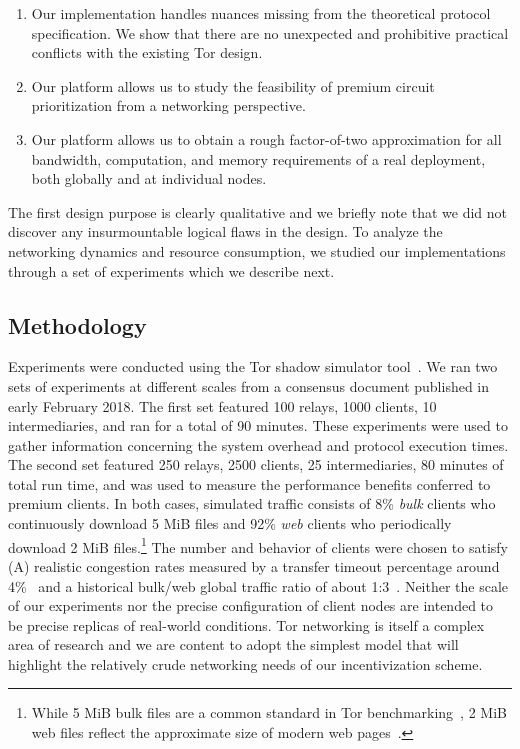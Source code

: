\begin{enumerate}
\item Our implementation handles nuances missing from the theoretical protocol specification. We show that there are no unexpected and prohibitive practical conflicts with the existing Tor design.
\item Our platform allows us to study the feasibility of premium circuit prioritization from a networking perspective.
\item Our platform allows us to obtain a rough factor-of-two approximation for all bandwidth, computation, and memory requirements of a real deployment, both globally and at individual nodes.
\end{enumerate}

The first design purpose is clearly qualitative and we briefly note that we did not discover any insurmountable logical flaws in the design.
To analyze the networking dynamics and resource consumption, we studied our implementations through a set of experiments which we describe next.

\subsection{Methodology}
\label{subsec:methodology}

Experiments were conducted using the Tor shadow simulator tool~\cite{jansen2011shadow, tracey2018high}.
We ran two sets of experiments at different scales from a consensus document published in early February 2018.
The first set featured 100 relays, 1000 clients, 10 intermediaries, and ran for a total of 90 minutes.
These experiments were used to gather information concerning the system overhead and protocol execution times.
The second set featured 250 relays, 2500 clients, 25 intermediaries, 80 minutes of total run time, and was used to measure the performance benefits conferred to premium clients.
In both cases, simulated traffic consists of 8\% \emph{bulk} clients who continuously download 5 MiB files and 92\% \emph{web} clients who periodically download 2 MiB files.\footnote{While 5 MiB bulk files are a common standard in Tor benchmarking~\cite{portal2018tormetrics}, 2 MiB web files reflect the approximate size of modern web pages~\cite{team2018httparchive}.}
The number and behavior of clients were chosen to satisfy (A) realistic congestion rates measured by a transfer timeout percentage around 4\%~\cite{portal2018tormetrics} and a historical bulk/web global traffic ratio of about 1:3~\cite{privcount-ccs2016, learning-ccs2018}.
Neither the scale of our experiments nor the precise configuration of client nodes are intended to be precise replicas of real-world conditions.
Tor networking is itself a complex area of research and we are content to adopt the simplest model that will highlight the relatively crude networking needs of our incentivization scheme.

